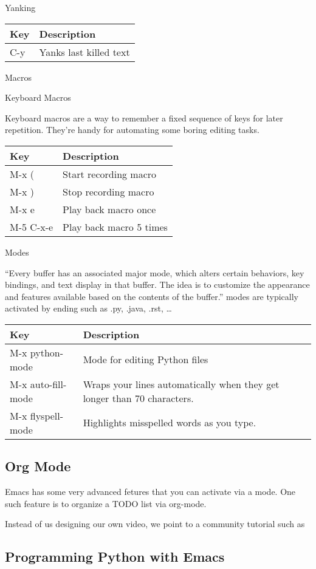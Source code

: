 Yanking

\begin{longtable}[]{ll}
\toprule
Key & Description\tabularnewline
\midrule
\endhead
C-y & Yanks last killed text\tabularnewline
\bottomrule
\end{longtable}

Macros

Keyboard Macros

Keyboard macros are a way to remember a fixed sequence of keys for later
repetition. They're handy for automating some boring editing tasks.

\begin{longtable}[]{ll}
\toprule
Key & Description\tabularnewline
\midrule
\endhead
M-x ( & Start recording macro\tabularnewline
M-x ) & Stop recording macro\tabularnewline
M-x e & Play back macro once\tabularnewline
M-5 C-x-e & Play back macro 5 times\tabularnewline
\bottomrule
\end{longtable}

Modes

``Every buffer has an associated major mode, which alters certain
behaviors, key bindings, and text display in that buffer. The idea is to
customize the appearance and features available based on the contents of
the buffer.'' modes are typically activated by ending such as .py,
.java, .rst, \ldots{}

\begin{longtable}[]{ll}
\toprule
Key & Description\tabularnewline
\midrule
\endhead
M-x python-mode & Mode for editing Python files\tabularnewline
M-x auto-fill-mode & Wraps your lines automatically when they get longer
than 70 characters.\tabularnewline
M-x flyspell-mode & Highlights misspelled words as you type.\tabularnewline
\bottomrule
\end{longtable}


\subsection{Org Mode}

Emacs has some very advanced fetures that you can activate via a
mode. One such feature is to organize a TODO list via org-mode.

Instead of us designing our own video, we point to a community
tutorial such as



\subsection{Programming Python with Emacs}

